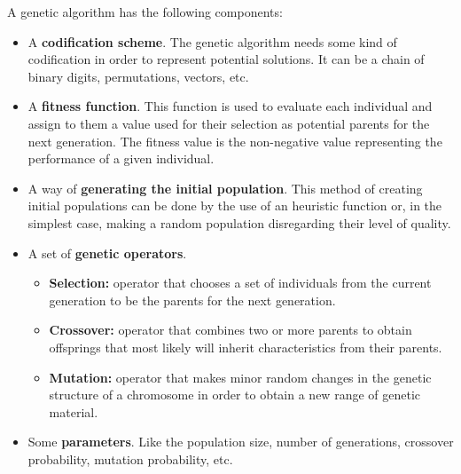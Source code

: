 \documentclass[11pt]{llncs}
\begin{document}
A genetic algorithm has the following components:
\begin{itemize}
    \item A \textbf{codification scheme}. The genetic algorithm needs some kind of codification in order to represent potential solutions. It can be a chain of binary digits, permutations, vectors, etc. 
    \item A \textbf{fitness function}. This function is used to evaluate each individual and assign to them a value used for their selection as potential parents for the next generation. The fitness value is the non-negative value representing the performance of a given individual.
    \item A way of \textbf{generating the initial population}. This method of creating initial populations can be done by the use of an heuristic function or, in the simplest case, making a random population disregarding their level of quality.
    \item A set of \textbf{genetic operators}. 
    \begin{itemize}
        \item \textbf{Selection:} operator that chooses a set of individuals from the current generation to be the parents for the next generation.
        \item \textbf{Crossover:} operator that combines two or more parents to obtain offsprings that most likely will inherit characteristics from their parents.
        \item \textbf{Mutation:} operator that makes minor random changes in the genetic structure of a chromosome in order to obtain a new range of genetic material.
    \end{itemize}
    \item Some \textbf{parameters}. Like the population size, number of generations, crossover probability, mutation probability, etc.
\end{itemize}
\end{document}
